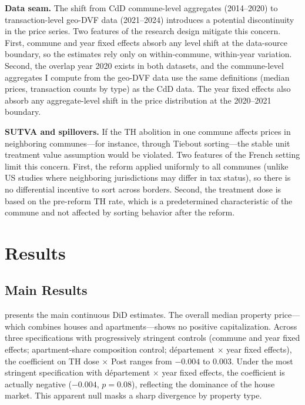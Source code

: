 \documentclass[12pt]{article}
\begin{document}
\textbf{Data seam.} The shift from CdD commune-level aggregates (2014--2020) to transaction-level geo-DVF data (2021--2024) introduces a potential discontinuity in the price series. Two features of the research design mitigate this concern. First, commune and year fixed effects absorb any level shift at the data-source boundary, so the estimates rely only on within-commune, within-year variation. Second, the overlap year 2020 exists in both datasets, and the commune-level aggregates I compute from the geo-DVF data use the same definitions (median prices, transaction counts by type) as the CdD data. The year fixed effects also absorb any aggregate-level shift in the price distribution at the 2020--2021 boundary.

\textbf{SUTVA and spillovers.} If the TH abolition in one commune affects prices in neighboring communes---for instance, through Tiebout sorting---the stable unit treatment value assumption would be violated. Two features of the French setting limit this concern. First, the reform applied uniformly to all communes (unlike US studies where neighboring jurisdictions may differ in tax status), so there is no differential incentive to sort across borders. Second, the treatment dose is based on the pre-reform TH rate, which is a predetermined characteristic of the commune and not affected by sorting behavior after the reform.


\section{Results}

\subsection{Main Results}

 presents the main continuous DiD estimates. The overall median property price---which combines houses and apartments---shows no positive capitalization. Across three specifications with progressively stringent controls (commune and year fixed effects; apartment-share composition control; d\'{e}partement $\times$ year fixed effects), the coefficient on TH dose $\times$ Post ranges from $-0.004$ to $0.003$. Under the most stringent specification with d\'{e}partement $\times$ year fixed effects, the coefficient is actually negative ($-0.004$, $p = 0.08$), reflecting the dominance of the house market. This apparent null masks a sharp divergence by property type.
\end{document}
